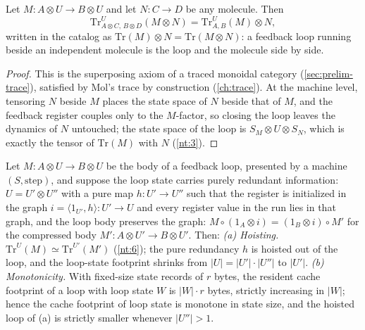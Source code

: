 \begin{theorem}[Superposing (NT36)]\label{nt:36}
Let $M : A \otimes U \to B \otimes U$ and let $N : C \to D$ be any molecule.
Then
\[
\mathrm{Tr}^{U}_{A \otimes C,\, B \otimes D}(M \otimes N)
= \mathrm{Tr}^{U}_{A,B}(M) \otimes N ,
\]
written in the catalog as $\mathrm{Tr}(M) \otimes N = \mathrm{Tr}(M \otimes
N)$: a feedback loop running beside an independent molecule is the loop
and the molecule side by side.
\end{theorem}

\begin{proof}
This is the superposing axiom of a traced monoidal category
(\autoref{sec:prelim-trace}), satisfied by Mol's trace by construction
(\autoref{ch:trace}). At the machine level, tensoring $N$ beside $M$
places the state space of $N$ beside that of $M$, and the feedback register
couples only to the $M$-factor, so closing the loop leaves the dynamics of
$N$ untouched; the state space of the loop is $S_M \otimes U \otimes S_N$,
which is exactly the tensor of $\mathrm{Tr}(M)$ with $N$
(\autoref{nt:3}).
\end{proof}

\begin{theorem}\label{nt:37}
Let $M : A \otimes U \to B \otimes U$ be the body of a feedback loop,
presented by a machine $(S, \mathrm{step})$, and suppose the loop state
carries purely redundant information: $U = U' \otimes U''$ with a pure map
$h : U' \to U''$ such that the register is initialized in the graph
$i = \langle 1_{U'}, h\rangle : U' \to U$ and every register value in the
run lies in that graph, and the loop body preserves the graph:
$M \circ (1_A \otimes i) = (1_B \otimes i) \circ M'$ for the compressed
body $M' : A \otimes U' \to B \otimes U'$. Then:
\emph{(a) Hoisting.} $\mathrm{Tr}^{U}(M) \simeq \mathrm{Tr}^{U'}(M')$
(\autoref{nt:6}); the pure redundancy $h$ is hoisted out of the loop, and
the loop-state footprint shrinks from $|U| = |U'| \cdot |U''|$ to $|U'|$.
\emph{(b) Monotonicity.} With fixed-size state records of $r$ bytes, the
resident cache footprint of a loop with loop state $W$ is $|W| \cdot r$
bytes, strictly increasing in $|W|$; hence the cache footprint of loop
state is monotone in state size, and the hoisted loop of (a) is strictly
smaller whenever $|U''| > 1$.
\end{theorem}

